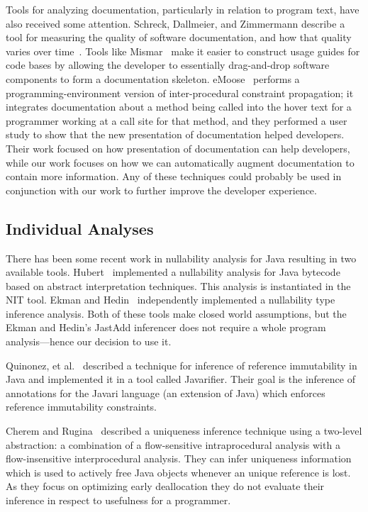 Tools for analyzing documentation, particularly in relation to program text,
have also received some attention.  Schreck, Dallmeier, and Zimmermann describe
a tool for measuring the quality of software documentation, and how that
quality varies over time~\cite{evolvedoc}. Tools like Mismar~\cite{mismar} make
it easier to construct usage guides for code bases by allowing the developer to
essentially drag-and-drop software components to form a documentation skeleton.
eMoose~\cite{emoose} performs a programming-environment version of
inter-procedural constraint propagation; it integrates
documentation about a method being called into the hover text for a programmer
working at a call site for that method, and they performed a user study to show
that the new presentation of documentation helped developers.  Their work
focused on how presentation of documentation can help developers, while our work
focuses on how we can automatically augment documentation to contain more
information.  Any of these
techniques could probably be used
in conjunction with our work to further improve the developer experience.

\subsection{Individual Analyses}

There has been some recent work in nullability analysis for Java
resulting in two available tools.  Hubert~\cite{NIT} implemented a nullability
analysis for Java bytecode based on abstract interpretation techniques.  This
analysis is instantiated in the {\sc NIT} tool.  Ekman and
Hedin~\cite{NonNullTypeInference} independently implemented a nullability type
inference analysis.  Both of these tools make closed world assumptions, but the
Ekman and Hedin's JastAdd inferencer does not require a whole program
analysis---hence our decision to use it.

Quinonez, et al.~\cite{Javarifier} described a technique for inference of
reference immutability in Java and implemented it in a tool called {\sc
  Javarifier}. Their goal is the inference of annotations for the {\sc Javari}
language (an extension of Java) which enforces reference immutability
constraints. %

Cherem and Rugina~\cite{UniquenessInference} described a uniqueness inference
technique using a two-level abstraction: a combination of a flow-sensitive
intraprocedural analysis with a flow-insensitive interprocedural analysis. 
They can infer uniqueness information which is used to actively free Java
objects whenever an unique reference is lost. As they focus on optimizing 
early deallocation they do not evaluate their inference in respect to usefulness
for a programmer.

